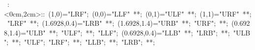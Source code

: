 \hbox{
\xy    <2cm,0cm>:<0cm,2cm>::
       (1,0)="LRF"; (0,0)="LLF" **\dir{-}; (0,1)="ULF" **\dir{-};
       (1,1)="URF" **\dir{-}; "LRF" **\dir{-}; (1.6928,0.4)="LRB" 
       **\dir{-}; (1.6928,1.4)="URB" **\dir{-}; "URF"; **\dir{-}; (0.6928,1.4)="ULB"
       **\dir{-}; "ULF"; **\dir{-};
       "LLF"; (0.6928,0.4)="LLB" **\dir{--}; "LRB"; **\dir{--}; "ULB"; **;
       "ULF"; "LRF"; **\dir{-}; "LLB"; **\dir{--}; "LRB"; **\dir{--};
\endxy}
